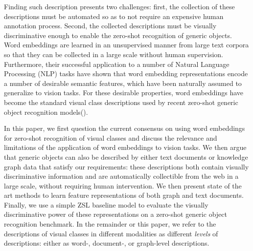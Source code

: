 Finding such description presents two challenges: first, the collection of these descriptions must be automated so as to not require an expensive human annotation process. Second, the collected descriptions must be visually discriminative enough to enable the zero-shot recognition of generic objects. Word embeddings are learned in an unsupervised manner from large text corpora so that they can be collected in a large scale without human supervision. Furthermore, their successful application to a number of Natural Language Processing (NLP) tasks have shown that word embedding representations encode a number of desirable semantic features, which have been naturally assumed to generalize to vision tasks. For these desirable properties, word embeddings have become the standard visual class descriptions used by recent zero-shot generic object recognition models(\cite{kodirov2017semantic,xian2017zero,frome2013devise,changpinyo2016synthesized,norouzi2013zero}).

In this paper, we first question the current consensus on using word embeddings for zero-shot recognition of visual classes and discuss the relevance and limitations of the application of word embeddings to vision tasks. We then argue that generic objects can also be described by either text documents or knowledge graph data that satisfy our requirements: these descriptions both contain visually discriminative information and are automatically collectible from the web in a large scale, without requiring human intervention. We then present state of the art methods to learn feature representations of both graph and text documents. Finally, we use a simple ZSL baseline \cite{romera2015embarrassingly} model to evaluate the visually discriminative power of these representations on a zero-shot generic object recognition benchmark. In the remainder or this paper, we refer to the descriptions of visual classes in different modalities as different \textit{levels} of descriptions: either as word-, document-, or graph-level descriptions. 

